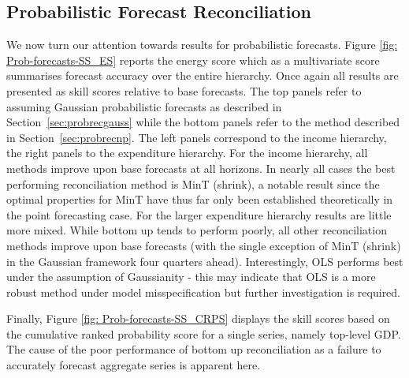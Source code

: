 \documentclass[graybox]{svmult}
\begin{document}
\subsection{Probabilistic Forecast Reconciliation}

We now turn our attention towards results for probabilistic forecasts.  Figure \ref{fig: Prob-forecasts-SS_ES} reports the energy score which as a multivariate score summarises forecast accuracy over the entire hierarchy.  Once again all results are presented as skill scores relative to base forecasts.  The top panels refer to assuming Gaussian probabilistic forecasts as described in Section~\ref{sec:probrecgauss} while the bottom panels refer to the method described in Section~\ref{sec:probrecnp}.  The left panels correspond to the income hierarchy, the right panels to the expenditure hierarchy.  For the income hierarchy, all methods improve upon base forecasts at all horizons.  In nearly all cases the best performing reconciliation method is MinT (shrink), a notable result since the optimal properties for MinT have thus far only been established theoretically in the point forecasting case.  For the larger expenditure hierarchy results are little more mixed.  While bottom up tends to perform poorly, all other reconciliation methods improve upon base forecasts (with the single exception of MinT (shrink) in the Gaussian framework four quarters ahead).  Interestingly, OLS performs best under the assumption of Gaussianity - this may indicate that OLS is a more robust method under model misspecification but further investigation is required.

Finally, Figure \ref{fig: Prob-forecasts-SS_CRPS} displays the skill scores based on the cumulative ranked probability score for a single series, namely top-level GDP.  The cause of the poor performance of bottom up reconciliation as a failure to accurately forecast aggregate series is apparent here.
\end{document}
